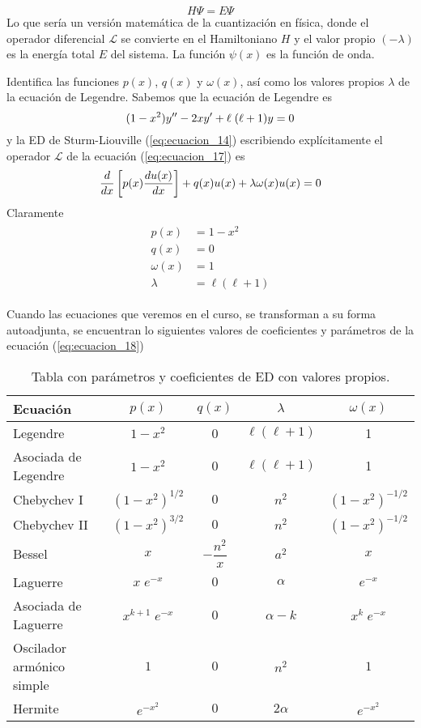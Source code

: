 \begin{equation}
H \Psi = E \Psi
\label{eq:ecuacion_16}
\end{equation}
Lo que sería un versión matemática de la cuantización en física, donde el operador diferencial $\mathscr{L}$ se convierte en el Hamiltoniano $H$ y el valor propio $(-\lambda)$ es la energía total $E$ del sistema. La función $\psi (x)$ es la función de onda.
\begin{ejemplo}{Identifica las funciones $p(x)$, $q(x)$ y $\omega(x)$, así como los valores propios $\lambda$ de la ecuación de Legendre.}
Sabemos que la ecuación de Legendre es
\begin{equation}
(1-x^{2}) y^{\prime \prime} - 2x y^{\prime} + \ell \;( \ell + 1) y = 0
\label{eq:ecuacion_17}
\end{equation}
y la ED de Sturm-Liouville (\ref{eq:ecuacion_14}) escribiendo explícitamente el operador $\mathscr{L}$ de la ecuación (\ref{eq:ecuacion_17}) es
\begin{equation}
\dfrac{d {}}{d x} \left[ p(x) \dfrac{d {u(x)}}{d x} \right] + q(x) u(x) + \lambda \omega (x) u(x) = 0
\label{eq:ecuacion_18}
\end{equation}
Claramente
\begin{eqnarray}
\begin{aligned}
p(x) &= 1 - x^{2} \\
q(x) &= 0 \\
\omega (x) &=  1 \\
\lambda &= \ell (\ell + 1)
\end{aligned}
\label{eq:ecuacion_19}
\end{eqnarray}
\end{ejemplo}
Cuando las ecuaciones que veremos en el curso, se transforman a su forma autoadjunta, se encuentran lo siguientes valores de coeficientes y parámetros de la ecuación (\ref{eq:ecuacion_18})
\begin{table}[H]
\centering
\begin{tabular}{p{6cm} c c c c }
\hline
Ecuación & $p(x)$ & $q(x)$ & $\lambda$ & $\omega(x)$ \\ \hline
Legendre & $1 - x^{2}$ & 0 & $\ell (\ell + 1)$ & 1  \\
Asociada de Legendre & $1 - x^{2}$ & 0 & $\ell (\ell + 1)$ & 1  \\
Chebychev I & $(1 - x^{2})^{1/2}$ & $0$ & $n^{2}$ & $(1 - x^{2})^{-1/2}$ \\
Chebychev II & $(1 - x^{2})^{3/2}$ & $0$ & $n^{2}$ & $(1 - x^{2})^{-1/2}$ \\
Bessel & $x$ & $- \dfrac{n^{2}}{x}$ & $a^{2}$ & $x$ \\
Laguerre & $x \; e^{-x}$ & $0$ & $\alpha$ & $e^{-x}$ \\
Asociada de Laguerre & $x^{k+1} \; e^{-x}$ & $0$  & $\alpha - k$ & $x^{k} \; e^{-x}$ \\
Oscilador armónico simple & $1$ & $0$ & $n^{2}$ & $1$ \\
Hermite & $e^{-x^{2}}$ & $0$ & $2 \alpha$ & $e^{-x^{2}}$ 
\end{tabular}
\caption{Tabla con parámetros y coeficientes de ED con valores propios.}
\label{tabla:tabla_01}
\end{table}
